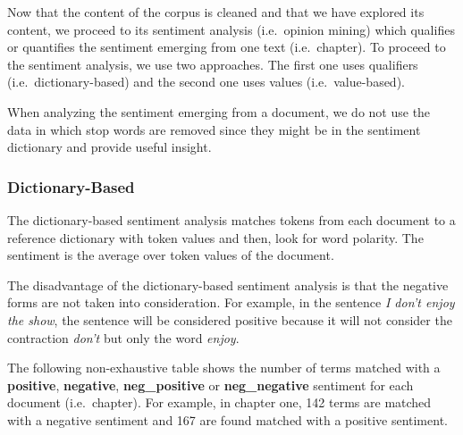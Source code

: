 \documentclass[
]{article}
\begin{document}
Now that the content of the corpus is cleaned and that we have explored
its content, we proceed to its sentiment analysis (i.e.~opinion mining)
which qualifies or quantifies the sentiment emerging from one text
(i.e.~chapter). To proceed to the sentiment analysis, we use two
approaches. The first one uses qualifiers (i.e.~dictionary-based) and
the second one uses values (i.e.~value-based).

When analyzing the sentiment emerging from a document, we do not use the
data in which stop words are removed since they might be in the
sentiment dictionary and provide useful insight.

\hypertarget{dictionary-based}{%
\subsubsection{Dictionary-Based}\label{dictionary-based}}

The dictionary-based sentiment analysis matches tokens from each
document to a reference dictionary with token values and then, look for
word polarity. The sentiment is the average over token values of the
document.

The disadvantage of the dictionary-based sentiment analysis is that the
negative forms are not taken into consideration. For example, in the
sentence \emph{I don't enjoy the show}, the sentence will be considered
positive because it will not consider the contraction \emph{don't} but
only the word \emph{enjoy}.

The following non-exhaustive table shows the number of terms matched
with a \textbf{positive}, \textbf{negative}, \textbf{neg\_positive} or
\textbf{neg\_negative} sentiment for each document (i.e.~chapter). For
example, in chapter one, 142 terms are matched with a negative sentiment
and 167 are found matched with a positive sentiment.
\end{document}
